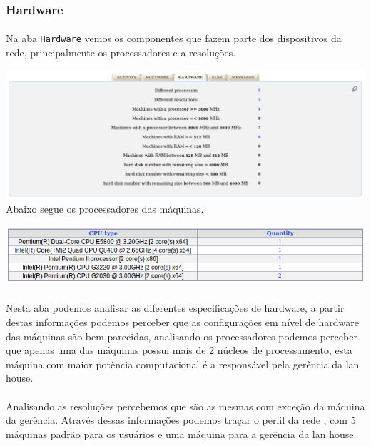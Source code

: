 \documentclass[a4paper]{article}
\begin{document}
    \subsubsection{Hardware}
     \paragraph{}
  Na aba \texttt{Hardware} vemos os componentes que fazem parte dos dispositivos da rede, principalmente os processadores e a resoluções. 
  	
    \includegraphics[scale = 0.3]{hardware.png}\\
  	
    Abaixo segue os processadores das máquinas.
    
    \includegraphics[scale = 0.5]{processors.png}\\
    \paragraph{}
    Nesta aba podemos analisar as diferentes especificações de hardware, a partir destas informações podemos perceber que as configurações em nível de hardware das máquinas são bem parecidas, analisando os processadores podemos perceber que apenas uma das máquinas possui mais de 2 núcleos de processamento, esta máquina com maior potência computacional é a responsável pela gerência da lan house.
     \paragraph{}
    Analisando as resoluções percebemos que são as mesmas com exceção da máquina da gerência. Através dessas informações podemos traçar o perfil da rede , com 5 máquinas padrão para os usuários e uma máquina para a gerência da lan house
\end{document}
